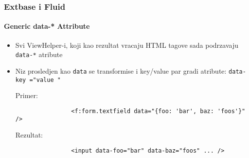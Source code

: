 \begin{frame}[fragile]
	\frametitle{Extbase i Fluid}
	\framesubtitle{Generic data-* Attribute}


	\begin{itemize}
		\item Svi ViewHelper-i, koji kao rezultat vracaju HTML tagove sada podrzavaju \texttt{data-*} atribute
		\item Niz prosledjen kao \texttt{data} se transformise i key/value par gradi atribute:
			\texttt{data-\begingroup\color{typo3orange}key\endgroup
				="\begingroup\color{typo3orange}value\endgroup
				"}\newline

			Primer:
			\begin{lstlisting}
				<f:form.textfield data="{foo: 'bar', baz: 'foos'}" />
			\end{lstlisting}

			Rezultat:
			\begin{lstlisting}
				<input data-foo="bar" data-baz="foos" ... />
			\end{lstlisting}
		
	\end{itemize}

\end{frame}


